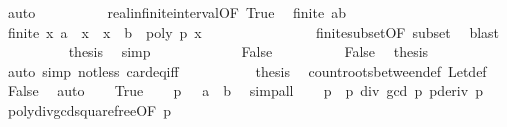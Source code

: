 \begin{isabellebody}
\ auto\isanewline
\ \ \ \ \ \ \ \ \isamarkupfalse%
\ real{\isacharunderscore}infinite{\isacharunderscore}interval{\isacharbrackleft}OF\ True{\isacharbrackright}\ \isamarkupfalse%
\ {\isachardoublequoteopen}{\isasymnot}finite\ {\isacharbraceleft}a{\isacharless}{\isachardot}{\isachardot}{\isacharless}b{\isacharbraceright}{\isachardoublequoteclose}\ \isacommand{{\isachardot}}\isamarkupfalse%
\isanewline
\ \ \ \ \ \ \ \ \isamarkupfalse%
\ {\isachardoublequoteopen}{\isasymnot}finite\ {\isacharbraceleft}x{\isachardot}\ a\ {\isacharless}\ x\ {\isasymand}\ x\ {\isasymle}\ b\ {\isasymand}\ poly\ p\ x\ {\isacharequal}\ {}{\isacharbraceright}{\isachardoublequoteclose}\isanewline
\ \ \ \ \ \ \ \ \ \ \ \ \isamarkupfalse%
\ finite{\isacharunderscore}subset{\isacharbrackleft}OF\ subset{\isacharbrackright}\ \isamarkupfalse%
\ blast\isanewline
\ \ \ \ \ \ \ \ \isamarkupfalse%
\ {\isacharquery}thesis\ \isamarkupfalse%
\ simp\isanewline
\ \ \ \ \isamarkupfalse%
\isanewline
\ \ \ \ \ \ \isamarkupfalse%
\ False\isanewline
\ \ \ \ \ \ \ \ \isamarkupfalse%
\ False{\isacharprime}\ \isamarkupfalse%
\ {\isacharquery}thesis\ \isamarkupfalse%
\ {\isacharparenleft}auto\ simp{\isacharcolon}\ not{\isacharunderscore}less\ card{\isacharunderscore}eq{\isacharunderscore}{}{\isacharunderscore}iff{\isacharparenright}\isanewline
\ \ \ \ \isamarkupfalse%
\isanewline
\ \ \ \ \isamarkupfalse%
\ {\isacharquery}thesis\ \isamarkupfalse%
\ count{\isacharunderscore}roots{\isacharunderscore}between{\isacharunderscore}def\ Let{\isacharunderscore}def\ \isamarkupfalse%
\ False\ \isamarkupfalse%
\ auto\isanewline
{}\isamarkupfalse%
\isanewline
\ \ \isamarkupfalse%
\ True\isanewline
\ \ \isamarkupfalse%
\ {\isachardoublequoteopen}p\ {\isasymnoteq}\ {}{\isachardoublequoteclose}\ {\isachardoublequoteopen}a\ {\isasymle}\ b{\isachardoublequoteclose}\ \isamarkupfalse%
\ simp{\isacharunderscore}all\isanewline
\ \ \isamarkupfalse%
\ p{\isacharprime}\ {\isasymequiv}\ {\isachardoublequoteopen}p\ div\ {\isacharparenleft}gcd\ p\ {\isacharparenleft}pderiv\ p{\isacharparenright}{\isacharparenright}{\isachardoublequoteclose}\isanewline
\ \ \isamarkupfalse%
\ poly{\isacharunderscore}div{\isacharunderscore}gcd{\isacharunderscore}squarefree{\isacharparenleft}{}{\isacharparenright}{\isacharbrackleft}OF\ {\isacharbackquoteopen}p\ {\isasymnoteq}\ {}{\isacharbackquoteclose}{\isacharbrackright}\ \isamarkupfalse%

\end{isabellebody}
